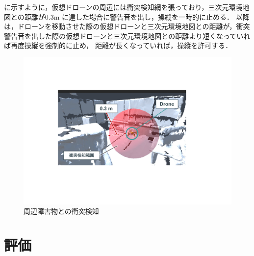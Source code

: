 \documentclass[a4paper,11pt]{ujreport}
\begin{document}
に示すように，仮想ドローンの周辺には衝突検知網を張っており，三次元環境地図との距離が0.3m に達した場合に警告音を出し，操縦を一時的に止める．
以降は，ドローンを移動させた際の仮想ドローンと三次元環境地図との距離が，衝突警告音を出した際の仮想ドローンと三次元環境地図との距離より短くなっていれば再度操縦を強制的に止め，
距離が長くなっていれば，操縦を許可する．

\begin{figure}[!tb]
  \centering
  \includegraphics[width=0.7\linewidth]{img/04_warning.pdf}
  \caption{周辺障害物との衝突検知}
  \label{fig:04_warning}
\end{figure}


\chapter{評価}
\label{chap:Experiment}

\end{document}

